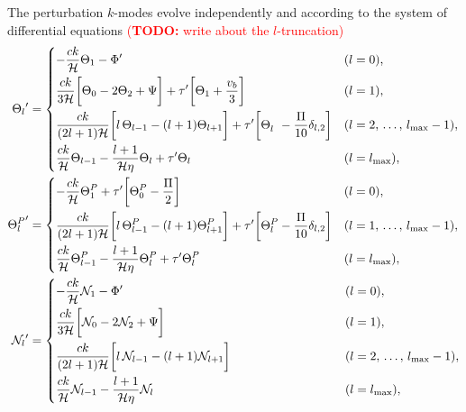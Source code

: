 \documentclass[10pt,a4paper]{article}
\newcommand\TODO[1]{\textcolor{red}{(\textbf{TODO:} #1)}}
\begin{document}
The perturbation $k$-modes evolve independently and according to the system of differential equations
\TODO{write about the $l$-truncation}
\begin{subequations}
\allowdisplaybreaks
\begin{align}
	{\Theta_l}^\prime   &= \begin{dcases}
	                       -\frac{ck}{\aH} \Theta_1 - \Phi^\prime & (l=0), \\
	                       \frac{ck}{3\aH} \bigg[ \Theta_0 - 2 \Theta_2 + \Psi \bigg] + \tau^\prime \bigg[ \Theta_1 + \frac{v_b}{3} \bigg] & (l=1), \\
	                       \frac{ck}{(2l+1)\aH} \bigg[ l \, \Theta_{l-1} - (l+1) \Theta_{l+1} \bigg] + \tau^\prime \bigg[ \Theta^{\phantom{P}}_l - \frac{\Pi}{10} \delta_{l,2} \bigg] & (l = 2,\, \ldots,\, l_\text{max}-1), \\
	                       \frac{ck}{\aH} \Theta_{l-1} - \frac{l+1}{\aH \eta} \Theta_l + \tau^\prime \Theta_l & (l=l_\text{max}), \\
	                       \end{dcases} \\
	{\Theta^P_l}^\prime &= \begin{dcases}
	                       -\frac{ck}{\aH} \Theta^P_1 + \tau^\prime \bigg[ \Theta^P_0 - \frac{\Pi}{2} \bigg] & (l=0), \\
	                       \frac{ck}{(2l+1)\aH} \bigg[ l \, \Theta^P_{l-1} - (l+1) \Theta^P_{l+1} \bigg] + \tau^\prime \bigg[ \Theta^P_l - \frac{\Pi}{10} \delta_{l,2} \bigg] & (l = 1,\, \ldots,\, l_\text{max}-1), \\
	                       \frac{ck}{\aH} \Theta^P_{l-1} - \frac{l+1}{\aH \eta} \Theta^P_l + \tau^\prime \Theta^P_l & (l=l_\text{max}), \\
	                       \end{dcases} \\
	{\N_l}^\prime       &= \begin{dcases}
	                       -\frac{ck}{\aH} \N_1 - \Phi^\prime & (l=0), \\
	                       \frac{ck}{3\aH} \bigg[ \N_0 - 2 \N_2 + \Psi \bigg] & (l=1) , \\
	                       \frac{ck}{(2l+1)\aH} \bigg[ l \, \N_{l-1} - (l+1) \N_{l+1} \bigg] \phantom{ {} + \tau^\prime \bigg[ \Theta^P_l - \frac{\Pi}{10} \delta_{l,2} \bigg]} & (l=2,\, \ldots,\, l_\text{max}-1), \\
	                       \frac{ck}{\aH} \N_{l-1} - \frac{l+1}{\aH \eta} \N_l & (l=l_\text{max}),

\end{dcases}
\end{align}
\end{subequations}
\end{document}
